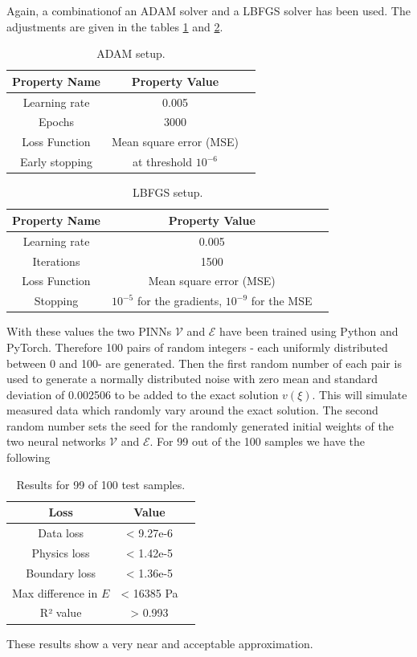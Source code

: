 \documentclass[a4paper,11pt]{article}
\begin{document}
Again, a combinationof an ADAM solver and a LBFGS solver has been used. The adjustments are given in the tables \ref{AdamSetup2} and \ref{LBFGSSetup2}.

\begin{table}[htbp]
\centering
\begin{tabular}{ccl}
\toprule
\textbf{Property Name} & \textbf{Property Value}\\
\midrule
Learning rate & 0.005\\
Epochs & 3000 \\
Loss Function & Mean square error (MSE) \\
Early stopping & at threshold $10^{-6} $ \\
\bottomrule
\end{tabular}
\caption{ADAM setup.}
\label{AdamSetup2}
\end{table}

\begin{table}[h!]
\centering
\begin{tabular}{ccl}
\toprule
\textbf{Property Name} & \textbf{Property Value}\\
\midrule
Learning rate & 0.005\\
Iterations & 1500 \\
Loss Function & Mean square error (MSE) \\
Stopping & $10^{-5} $ for the gradients, $10^{-9} $ for the MSE\\
\bottomrule
\end{tabular}
\caption{LBFGS setup.}
\label{LBFGSSetup2}
\end{table}

With these values the two PINNs $\mathscr{V}$ and $\mathscr{E} $ have been trained using Python and PyTorch. Therefore 100 pairs of random integers - each uniformly distributed between 0 and 100- are generated. Then the first random number of each pair is used to generate a normally distributed noise with zero mean and standard deviation of 0.002506 to be added to the exact solution $v(\xi ) $. This will simulate measured data which randomly vary around the exact solution. The second random number sets the seed for the randomly generated initial weights of the two neural networks $\mathscr{V}$ and $\mathscr{E} $.
For 99 out of the 100 samples we have the following 
\begin{table}[h!]
\centering
\begin{tabular}{ccl}
\toprule
\textbf{Loss} & \textbf{Value}\\
\midrule
Data loss & < 9.27e-6\\
Physics loss & < 1.42e-5\\
Boundary loss & < 1.36e-5 \\
Max difference in $E $ & < 16385 Pa \\
R² value & > 0.993 \\
\bottomrule
\end{tabular}
\caption{Results for 99 of 100 test samples.}
\end{table}
These results show a very near and acceptable approximation.
\end{document}
